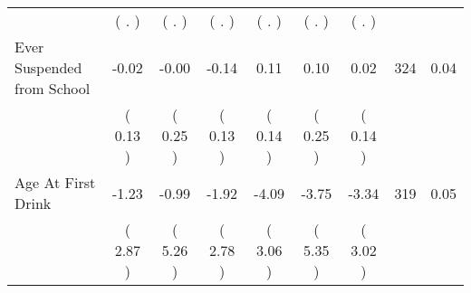 \begin{tabular}{lcccccccc}
 & (        . ) & (        . ) & (        . ) & (        . ) & (        . ) & (        . ) & \\
Ever Suspended from School &     -0.02 &     -0.00 &     -0.14 &      0.11 &      0.10 &      0.02 & 324 &       0.04 \\ 
 & (     0.13 ) & (     0.25 ) & (     0.13 ) & (     0.14 ) & (     0.25 ) & (     0.14 ) & \\
Age At First Drink &     -1.23 &     -0.99 &     -1.92 &     -4.09 &     -3.75 &     -3.34 & 319 &       0.05 \\ 
 & (     2.87 ) & (     5.26 ) & (     2.78 ) & (     3.06 ) & (     5.35 ) & (     3.02 ) & \\
\bottomrule
\end{tabular}
